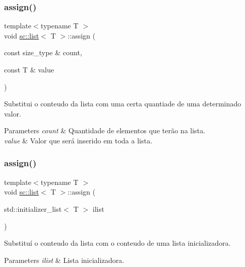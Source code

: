 \subsubsection{\texorpdfstring{assign()}{assign()}\hspace{0.1cm}{\footnotesize\ttfamily [1/2]}}
{\footnotesize\ttfamily template$<$typename T $>$ \\
void \hyperlink{classsc_1_1list}{sc\+::list}$<$ T $>$\+::assign (\begin{DoxyParamCaption}\item[{const size\+\_\+type \&}]{count,  }\item[{const T \&}]{value }\end{DoxyParamCaption})\hspace{0.3cm}{\ttfamily [inline]}}

Substitui o conteudo da lista com uma certa quantiade de uma determinado valor. 
\begin{DoxyParams}{Parameters}
{\em count} & Quantidade de elementos que terão na lista. \\
\hline
{\em value} & Valor que será inserido em toda a lista. \\
\hline
\end{DoxyParams}
\mbox{\label{classsc_1_1list_a495ac9f4a80b40ba7d37e6badf24445f}} 
\subsubsection{\texorpdfstring{assign()}{assign()}\hspace{0.1cm}{\footnotesize\ttfamily [2/2]}}
{\footnotesize\ttfamily template$<$typename T $>$ \\
void \hyperlink{classsc_1_1list}{sc\+::list}$<$ T $>$\+::assign (\begin{DoxyParamCaption}\item[{std\+::initializer\+\_\+list$<$ T $>$}]{ilist }\end{DoxyParamCaption})\hspace{0.3cm}{\ttfamily [inline]}}

Substituí o conteudo da lista com o conteudo de uma lista inicializadora. 
\begin{DoxyParams}{Parameters}
{\em ilist} & Lista inicializadora. \\
\hline
\end{DoxyParams}
\mbox{\label{classsc_1_1list_a4835abb7fb3362c357d534db60e0ba6e}} 
